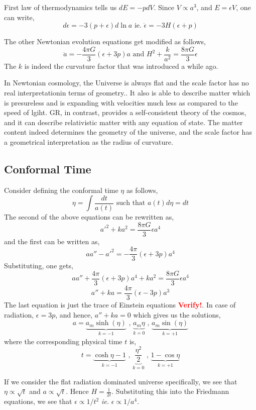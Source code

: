 \documentclass[a4paper,11pt]{article}
\begin{document}
First law of thermodynamics tells us $dE = -pdV$. Since $V \propto a^3$, and $E = \epsilon V$, one can write,
$$d \epsilon = -3 (p+\epsilon) d\ln a \text{ ie. } \dot{\epsilon} = -3H(\epsilon + p)$$

The other Newtonian evolution equations get modified as follows, 
$$\ddot{a} = -\frac{4 \pi G}{3}(\epsilon + 3p)a \text{ and } H^2 + \frac{k}{a^2} = \frac{8 \pi G}{3}\epsilon$$ 
The $k$ is indeed the curvature factor that was introduced a while ago.

In Newtonian cosmology, the Universe is always flat and the scale factor has no real interpretationin terms of geometry.. It also is able to describe matter which is presureless and is expanding with velocities much less as compared to the speed of lgiht. GR, in contrast, provides a self-consistent theory of the cosmos, and it can describe relativistic matter with any equation of state. The matter content indeed determines the geometry of the universe, and the scale factor has a geometrical interpretation as the radius of curvature.

\subsection{Conformal Time}
Consider defining the conformal time $\eta$ as follows,
$$\eta = \int \frac{dt}{a(t)} \text{ such that } a(t)d\eta = dt$$
The second of the above equations can be rewritten as,
$$ a'^2 + k a^2 = \frac{8\pi G}{3}\epsilon a^4$$  and the first can be written as,
$$a a'' -a'^2 = -\frac{4 \pi}{3}(\epsilon + 3p)a^4$$
Substituting, one gets,
$$a a'' + \frac{4 \pi}{3}(\epsilon + 3p)a^4 + k a^2 = \frac{8\pi G}{3}\epsilon a^4$$
$$a'' + k a = \frac{4 \pi}{3}(\epsilon - 3p)a^3 $$
The last equation is just the trace of Einstein equations \textbf{\textcolor{red}{Verify!}}. In case of radiation, $\epsilon = 3p$, and hence, $a'' + ka = 0$ which gives us the solutions,
$$a = \underbrace{a_m \sinh(\eta)}_{k=-1} \text{ , }\underbrace{a_m \eta}_{k=0} \text{ , } \underbrace{a_m \sin(\eta)}_{k=+1} $$ where the corresponding physical time $t$ is,
$$t = \underbrace{\cosh \eta - 1}_{k=-1} \text{ , }\underbrace{\frac{\eta^2}{2}}_{k=0} \text{ , } \underbrace{1 - \cos \eta}_{k=+1} $$

If we consider the flat radiation dominated universe specifically, we see that $\eta \propto \sqrt{t}$ and $a \propto \sqrt{t}$. Hence $H = \frac{1}{2t}$. Substituting this into the Friedmann equations, we see that $\epsilon \propto 1/t^2$ \textit{ie.} $\epsilon \propto 1/a^4$.
\end{document}
